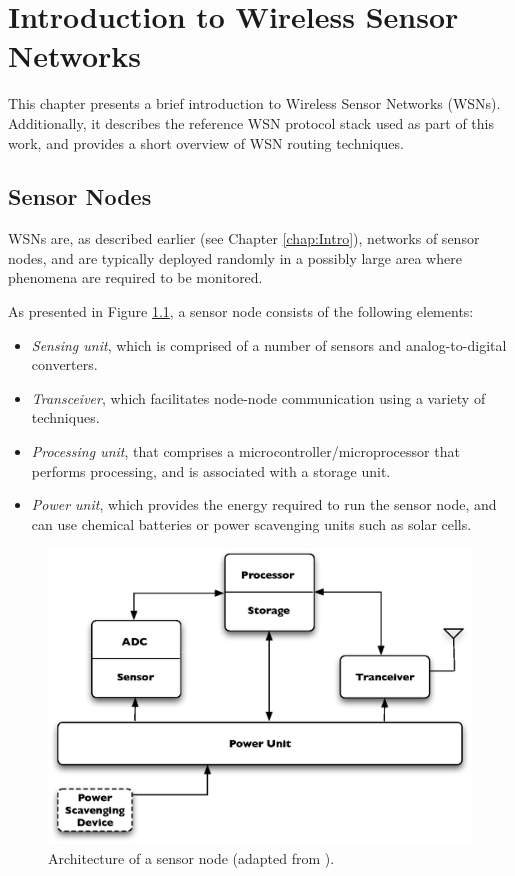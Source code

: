 \chapter{Introduction to Wireless Sensor Networks} \label{chap:IntroWSN}
This chapter presents a brief introduction to Wireless Sensor Networks (WSNs).
Additionally, it describes the reference WSN protocol stack used as part of this
work, and provides a short overview of WSN routing techniques.

\section{Sensor Nodes} \label{subsec:sensornodes}
WSNs are, as described earlier (see Chapter \ref{chap:Intro}), networks of sensor
nodes, and are typically deployed randomly in a possibly large area where
phenomena are required to be monitored.

As presented in Figure \ref{Fig:SensorNodeArch}, a sensor node consists of
the following elements:
\begin{itemize}
  \item \emph{Sensing unit}, which is comprised of a number of sensors and
  analog-to-digital converters. 
  \item \emph{Transceiver}, which facilitates node-node communication using 
a variety of techniques.
  \item \emph{Processing unit}, that comprises a 
microcontroller/microprocessor that performs processing, and is associated with 
a storage unit.
  \item \emph{Power unit}, which provides the energy required to run the sensor node, and can use chemical 
batteries or power scavenging units such as solar cells.
\end{itemize}

\begin{figure}[h]
\centering
\includegraphics[scale=0.65]{img/SensorNodeArch.eps} 
\caption[Architecture of a sensor node] {Architecture of a sensor node (adapted from \cite{SensorSurveyAkyildiz:2002}).}
\label{Fig:SensorNodeArch}
\end{figure} 


